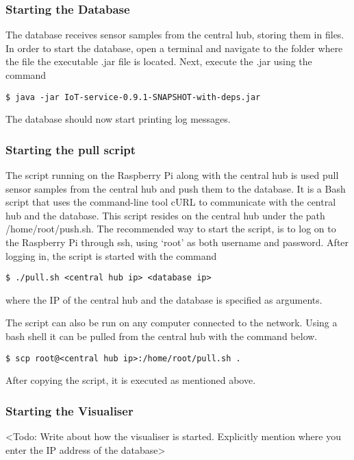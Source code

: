 \documentclass[../document.tex]{subfiles}
\begin{document}
\subsubsection{Starting the Database}
The database receives sensor samples from the central hub, storing them in files. In order to start the database, open a terminal and navigate to the folder where the file the executable .jar file is located. Next, execute the .jar using the command
\lstset{style=custombash}
\begin{lstlisting}
$ java -jar IoT-service-0.9.1-SNAPSHOT-with-deps.jar
\end{lstlisting}
The database should now start printing log messages.



\subsubsection{Starting the pull script}
The script running on the \gls{Raspberry Pi} along with the central hub is used pull sensor samples from the central hub and push them to the database. It is a Bash script that uses the command-line tool cURL to communicate with the central hub and the database. This script resides on the central hub under the path /home/root/push.sh. The recommended way to start the script, is to log on to the \gls{Raspberry Pi} through ssh, using ‘root’ as both username and password. After logging in, the script is started with the command
\lstset{style=custombash}
\begin{lstlisting}
$ ./pull.sh <central hub ip> <database ip>
\end{lstlisting}
where the IP of the central hub and the database is specified as arguments.

The script can also be run on any computer connected to the network. Using a bash shell it can be pulled from the central hub with the command below.
\lstset{style=custombash}
\begin{lstlisting}[caption=Bash command to copy the central hub script. Note the period at the end.]
$ scp root@<central hub ip>:/home/root/pull.sh .
\end{lstlisting}
After copying the script, it is executed as mentioned above.

\subsubsection{Starting the Visualiser}
{\color{red} <Todo: Write about how the visualiser is started. Explicitly mention where you enter the IP address of the database>}
\end{document}
